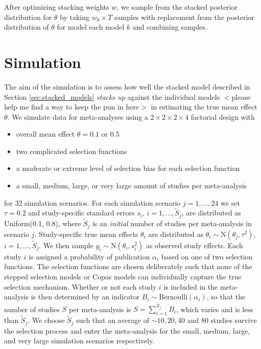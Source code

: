 \documentclass[12pt]{article}   	%
\numberwithin{equation}{section}
\begin{document}
After optimizing stacking weights $w$, we sample from the stacked posterior distribution for $\theta$ by taking $w_k \times T$ samples with replacement from the posterior distribution of $\theta$ for model each model $k$ and combining samples. 

\section{Simulation} \label{sec:simulation}

The aim of the simulation is to assess how well the stacked model described in Section \ref{sec:stacked_models} \textit{stacks up} against the individual models $<$please help me find a way to keep the pun in here$>$ in estimating the true mean effect $\theta$. We simulate data for meta-analyses using a $2\times 2 \times 2 \times 4$ factorial design with 
\begin{itemize}
\item{overall mean effect $\theta = 0.1$ or $0.5$}
\item{two complicated selection functions}
\item{a moderate or extreme level of selection bias for each selection function}
\item{a small, medium, large, or very large amount of studies per meta-analysis}
\end{itemize}
for 32 simulation scenarios. For each simulation scenario $j = 1, \dots, 24$ we set $\tau = 0.2$ and study-specific standard errors $s_{i}$, $i = 1, \dots, \widetilde{S}_j$, are distributed as Uniform(0.1, 0.8), where $\widetilde{S}_j$ is an \textit{initial} number of studies per meta-analysis in scenario $j$. Study-specific true mean effects $\theta_{i}$ are distributed as $\theta_{i} \sim \text{N}(\theta_j, \tau^2)$, $i = 1, \dots, \widetilde{S}_j$. We then sample $y_{i} \sim \text{N}(\theta_i, s_i^2)$ as observed study effects. Each study $i$ is assigned a probability of publication $\alpha_i$ based on one of two selection functions. The selection functions are chosen deliberately such that none of the stepped selection models or Copas models can individually capture the true selection mechanism. Whether or not each study $i$ is included in the meta-analysis is then determined by an indicator $B_i \sim \text{Bernoulli}(\alpha_i)$, so that the number of studies $S$ per meta-analysis is $S = \sum_{i=1}^{\widetilde{S}_j} B_i$, which varies and is less than $\widetilde{S}_j$. We choose $\widetilde{S}_j$ such that an average of $\sim 10, 20, 40$ and 80 studies survive the selection process and enter the meta-analysis for the small, medium, large, and very large simulation scenarios respectively. 
\end{document}

